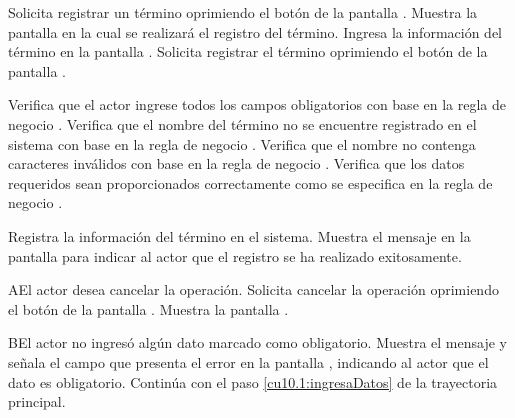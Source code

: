  \begin{UCtrayectoria}
    \UCpaso[\UCactor] Solicita registrar un término oprimiendo el botón  de la pantalla .
    \UCpaso[\UCsist] Muestra la pantalla  en la cual se realizará el registro del término. 
    \UCpaso[\UCactor] Ingresa la información del término en la pantalla . \label{cu10.1:ingresaDatos}
    \UCpaso[\UCactor] Solicita registrar el término oprimiendo el botón  de la pantalla . 
    
    \UCpaso[\UCsist] Verifica que el actor ingrese todos los campos obligatorios con base en la regla de negocio  . 
    \UCpaso[\UCsist] Verifica que el nombre del término no se encuentre registrado en el sistema con base en la regla de negocio  . 
    \UCpaso[\UCsist] Verifica que el nombre no contenga caracteres inválidos con base en la regla de negocio . 
    \UCpaso[\UCsist] Verifica que los datos requeridos sean proporcionados correctamente como se especifica en la regla de negocio .  
    
    \UCpaso[\UCsist] Registra la información del término en el sistema.
    \UCpaso[\UCsist] Muestra el mensaje  en la pantalla  
    para indicar al actor que el registro se ha realizado exitosamente.
 \end{UCtrayectoria}
 \begin{UCtrayectoriaA}{A}{El actor desea cancelar la operación.}
    \UCpaso[\UCactor] Solicita cancelar la operación oprimiendo el botón  de la pantalla .
    \UCpaso[\UCsist] Muestra la pantalla .
 \end{UCtrayectoriaA}
 \begin{UCtrayectoriaA}{B}{El actor no ingresó algún dato marcado como obligatorio.}
    \UCpaso[\UCsist] Muestra el mensaje  y señala el campo que presenta el error en la pantalla 
	    , indicando al actor que el dato es obligatorio.
    \UCpaso[] Continúa con el paso \ref{cu10.1:ingresaDatos} de la trayectoria principal.
 \end{UCtrayectoriaA}
